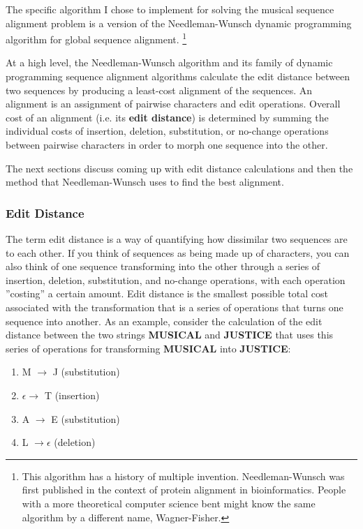 The specific algorithm I chose to implement for solving the musical sequence alignment problem is a version of the Needleman-Wunsch dynamic programming algorithm for global sequence alignment. \footnote{This algorithm has a history of multiple invention. Needleman-Wunsch was first published in the context of protein alignment in bioinformatics. People with a more theoretical computer science bent might know the same algorithm by a different name, Wagner-Fisher.} 

At a high level, the Needleman-Wunsch algorithm and its family of dynamic programming sequence alignment algorithms calculate the edit distance between two sequences by producing a least-cost alignment of the sequences. An alignment is an assignment of pairwise characters and edit operations. Overall cost of an alignment (i.e. its \textbf{edit distance}) is determined by summing the individual costs of insertion, deletion, substitution, or no-change operations between pairwise characters in order to morph one sequence into the other. 

The next sections discuss coming up with edit distance calculations and then the method that Needleman-Wunsch uses to find the best alignment. 

\subsubsection{Edit Distance}

The term edit distance is a way of quantifying how dissimilar two sequences are to each other. If you think of sequences as being made up of characters, you can also think of one sequence transforming into the other through a series of insertion, deletion, substitution, and no-change operations, with each operation ''costing'' a certain amount. Edit distance is the smallest possible total cost associated with the transformation that is a series of operations that turns one sequence into another. As an example, consider the calculation of the edit distance between the two strings \textbf{MUSICAL} and \textbf{JUSTICE} that uses this series of operations for transforming \textbf{MUSICAL} into \textbf{JUSTICE}:

\begin{enumerate}
\item M $\rightarrow$  J (substitution)
\item $\epsilon \rightarrow$  T (insertion)
\item A $\rightarrow$  E (substitution)
\item L $\rightarrow  \epsilon$ (deletion)
\end{enumerate}


